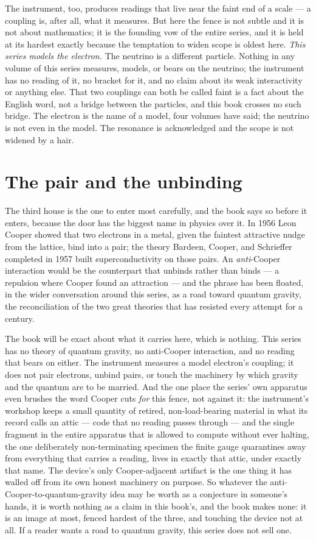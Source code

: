 The instrument, too, produces readings that live near the faint end of a
scale --- a coupling is, after all, what it measures. But here the fence is
not subtle and it is not about mathematics; it is the founding vow of the
entire series, and it is held at its hardest exactly because the temptation
to widen scope is oldest here. \emph{This series models the electron.} The
neutrino is a different particle. Nothing in any volume of this series
measures, models, or bears on the neutrino; the instrument has no reading
of it, no bracket for it, and no claim about its weak interactivity or
anything else. That two couplings can both be called faint is a fact about
the English word, not a bridge between the particles, and this book crosses
no such bridge. The electron is the name of a model, four volumes have said;
the neutrino is not even in the model. The resonance is acknowledged and
the scope is not widened by a hair.

\section*{The pair and the unbinding}

The third house is the one to enter most carefully, and the book says so
before it enters, because the door has the biggest name in physics over it.
In 1956 Leon Cooper showed that two electrons in a metal, given the
faintest attractive nudge from the lattice, bind into a pair; the theory
Bardeen, Cooper, and Schrieffer completed in 1957 built superconductivity
on those pairs. An \emph{anti}-Cooper interaction would be the counterpart
that unbinds rather than binds --- a repulsion where Cooper found an
attraction --- and the phrase has been floated, in the wider conversation
around this series, as a road toward quantum gravity, the reconciliation of
the two great theories that has resisted every attempt for a century.

The book will be exact about what it carries here, which is nothing. This
series has no theory of quantum gravity, no anti-Cooper interaction, and no
reading that bears on either. The instrument measures a model electron's
coupling; it does not pair electrons, unbind pairs, or touch the machinery
by which gravity and the quantum are to be married. And the one place the
series' own apparatus even brushes the word Cooper cuts \emph{for} this
fence, not against it: the instrument's workshop keeps a small quantity of
retired, non-load-bearing material in what its record calls an attic ---
code that no reading passes through --- and the single fragment in the
entire apparatus that is allowed to compute without ever halting, the one
deliberately non-terminating specimen the finite gauge quarantines away
from everything that carries a reading, lives in exactly that attic, under
exactly that name. The device's only Cooper-adjacent artifact is the one
thing it has walled off from its own honest machinery on purpose. So
whatever the anti-Cooper-to-quantum-gravity idea may be worth as a
conjecture in someone's hands, it is worth nothing as a claim in this
book's, and the book makes none: it is an image at most, fenced hardest of
the three, and touching the device not at all. If a reader wants a road to
quantum gravity, this series does not sell one.

